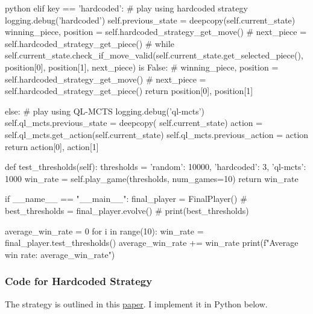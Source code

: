 \begin{mintedbox}{python}
            elif key == 'hardcoded':
                # play using hardcoded strategy
                logging.debug('hardcoded')
                self.previous_state = deepcopy(self.current_state)
                winning_piece, position = self.hardcoded_strategy_get_move()
                # next_piece = self.hardcoded_strategy_get_piece()
                # while self.current_state.check_if_move_valid(self.current_state.get_selected_piece(), position[0], position[1], next_piece) is False:
                #     winning_piece, position = self.hardcoded_strategy_get_move()
                #     next_piece = self.hardcoded_strategy_get_piece()
                return position[0], position[1]

            else:
                # play using QL-MCTS
                logging.debug('ql-mcts')
                self.ql_mcts.previous_state = deepcopy(
                    self.current_state)
                action = self.ql_mcts.get_action(self.current_state)
                self.ql_mcts.previous_action = action
                return action[0], action[1]

    def test_thresholds(self):
        thresholds = {'random': 10000,
                        'hardcoded': 3, 'ql-mcts': 1000}
        win_rate = self.play_game(thresholds, num_games=10)
        return win_rate

if __name__ == "__main__":
    final_player = FinalPlayer()
    # best_thresholds = final_player.evolve()
    # print(best_thresholds)

    average_win_rate = 0
    for i in range(10):
        win_rate = final_player.test_thresholds()
        average_win_rate += win_rate
    print(f"Average win rate: {average_win_rate}")
\end{mintedbox}

\subsubsection{Code for Hardcoded Strategy}

The strategy is outlined in this \href{https://scholarworks.umt.edu/cgi/viewcontent.cgi?article=1334&context=tme}{paper}. I implement it in Python below.

